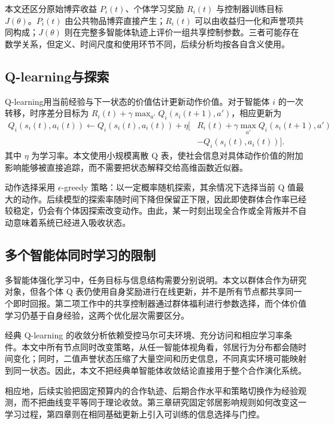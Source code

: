 本文还区分原始博弈收益 $P_i(t)$、个体学习奖励 $R_i(t)$ 与控制器训练目标 $J(\theta)$。$P_i(t)$ 由公共物品博弈直接产生；$R_i(t)$ 可以由收益归一化和声誉项共同构成；$J(\theta)$ 则在完整多智能体轨迹上评价一组共享控制参数。三者可能存在数学关系，但定义、时间尺度和使用环节不同，后续分析均按各自含义使用。

\subsection{Q-learning与探索}

Q-learning用当前经验与下一状态的价值估计更新动作价值\cite{watkins1992q}。对于智能体 $i$ 的一次转移，时序差分目标为 $R_i(t)+\gamma\max_{a'}Q_i(s_i(t+1),a')$，相应更新为
\begin{equation}
 \begin{aligned}
 Q_i(s_i(t),a_i(t))\leftarrow Q_i(s_i(t),a_i(t))
 +\eta\bigl[&R_i(t)+\gamma\max_{a'}Q_i(s_i(t+1),a')\\
             &-Q_i(s_i(t),a_i(t))\bigr].
 \end{aligned}
 \label{eq:foundation-q}
\end{equation}
其中 $\eta$ 为学习率。本文使用小规模离散 Q 表，使社会信息对具体动作价值的附加影响能够被直接追踪，而不需要把状态解释交给高维函数近似器。

动作选择采用 $\epsilon$-greedy 策略：以一定概率随机探索，其余情况下选择当前 Q 值最大的动作。后续模型的探索率随时间下降但保留正下限，因此即使群体合作率已经较稳定，仍会有个体因探索改变动作。由此，某一时刻出现全合作或全背叛并不自动意味着系统已经进入吸收状态。

\subsection{多个智能体同时学习的限制}

多智能体强化学习中，任务目标与信息结构需要分别说明\cite{zhang2021multiagent}。本文以群体合作为研究对象，但各个体 Q 表仍使用自身奖励进行在线更新，并不是所有节点都共享同一个即时回报。第二项工作中的共享控制器通过群体福利进行参数选择，而个体价值学习仍基于自身经验，这两个优化层次需要区分。

经典 Q-learning 的收敛分析依赖受控马尔可夫环境、充分访问和相应学习率条件\cite{watkins1992q}。本文中所有节点同时改变策略，从任一智能体视角看，邻居行为分布都会随时间变化；同时，二值声誉状态压缩了大量空间和历史信息，不同真实环境可能映射到同一状态。因此，本文不把经典单智能体收敛结论直接用于整个合作演化系统。

相应地，后续实验把固定预算内的合作轨迹、后期合作水平和策略切换作为经验观测，而不把曲线变平等同于理论收敛。第三章研究固定邻居影响规则如何改变这一学习过程，第四章则在相同基础更新上引入可训练的信息选择与门控。


